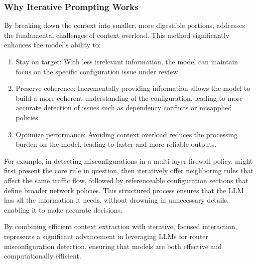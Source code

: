 \subsubsection{Why Iterative Prompting Works}
By breaking down the context into smaller, more digestible portions, \sysname{} addresses the fundamental challenges of context overload. This method significantly enhances the model’s ability to:
\begin{enumerate}
    \item Stay on target: With less irrelevant information, the model can maintain focus on the specific configuration issue under review.
    \item Preserve coherence: Incrementally providing information allows the model to build a more coherent understanding of the configuration, leading to more accurate detection of issues such as dependency conflicts or misapplied policies.
    \item Optimize performance: Avoiding context overload reduces the processing burden on the model, leading to faster and more reliable outputs.
\end{enumerate}

For example, in detecting misconfigurations in a multi-layer firewall policy, \sysname{} might first present the core rule in question, then iteratively offer neighboring rules that affect the same traffic flow, followed by referenceable configuration sections that define broader network policies. This structured process ensures that the LLM has all the information it needs, without drowning in unnecessary details, enabling it to make accurate decisions.

By combining efficient context extraction with iterative, focused interaction, \sysname{} represents a significant advancement in leveraging LLMs for router misconfiguration detection, ensuring that models are both effective and computationally efficient.